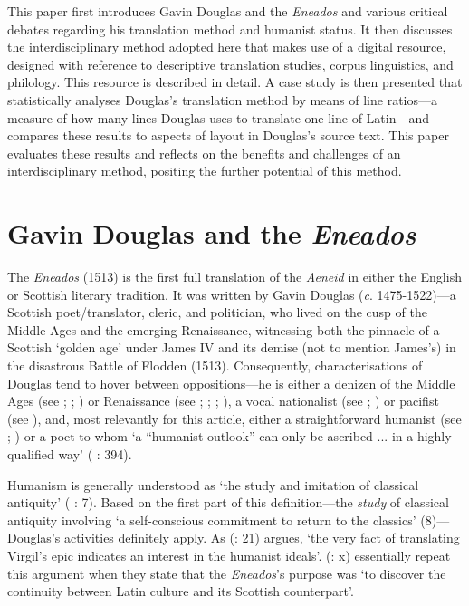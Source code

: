 \documentclass{dhbenelux}
\begin{document}
This paper first introduces Gavin Douglas and the \emph{Eneados} and
various critical debates regarding his translation method and humanist
status. It then discusses the interdisciplinary method adopted here that
makes use of a digital resource, designed with reference to descriptive
translation studies, corpus linguistics, and philology. This resource is
described in detail. A case study is then presented that statistically
analyses Douglas's translation method by means of line ratios---a
measure of how many lines Douglas uses to translate one line of
Latin---and compares these results to aspects of layout in Douglas's
source text. This paper evaluates these results and reflects on the
benefits and challenges of an interdisciplinary method, positing the
further potential of this method. 

\section{Gavin Douglas and the \emph{Eneados}}

The \emph{Eneados} (1513) is the first full translation of the
\emph{Aeneid} in either the English or Scottish literary tradition. It
was written by Gavin Douglas (\emph{c}. 1475-1522)---a Scottish
poet/translator, cleric, and politician, who lived on the cusp of the
Middle Ages and the emerging Renaissance, witnessing both the pinnacle
of a Scottish `golden age' under James IV and its demise (not to mention
James's) in the disastrous Battle of Flodden (1513). Consequently,
characterisations of Douglas tend to hover between oppositions---he is
either a denizen of the Middle Ages (see \citeauthor{lewis1954} 
\citeyear{lewis1954}; \citeauthor{rossi1965} \citeyear{rossi1965}; 
\citeauthor{blyth1987} \citeyear{blyth1987}) or Renaissance (see 
\citeauthor{dearing1952} \citeyear{dearing1952}; 
\citeauthor{brewerhall1960} \citeyear{brewerhall1960}; 
\citeauthor{fox1966} \citeyear{fox1966}; \citeauthor{morgan1977} 
\citeyear{morgan1977}), a vocal nationalist (see \citeauthor{canitz1996} 
\citeyear{canitz1996}; \citeauthor{corbett1999} \citeyear{corbett1999}) 
or pacifist (see \citeauthor{cummings1995} \citeyear{cummings1995}), 
and, most relevantly for this article, either a straightforward humanist 
(see \citeauthor{jack1972} \citeyear{jack1972}; \citeauthor{canitz1996} 
\citeyear{canitz1996}) or a poet to whom `a ``humanist outlook'' can only 
be ascribed ... in a highly qualified way' (\citeauthor{ross1986} 
\citeyear{ross1986}: 394).

Humanism is generally understood as `the study and imitation of
classical antiquity' (\citeauthor{wakelin2007} \citeyear{wakelin2007}: 
7). Based on the first part of this definition---the \emph{study} of 
classical antiquity involving `a self-conscious commitment to return to 
the classics' (8)---Douglas's activities definitely apply. As 
\citeauthor{jack1972} (\citeyear{jack1972}: 21) argues, `the very fact
of translating Virgil's epic indicates an interest in the humanist
ideals'. \citeauthor{johnsonpetrina2018} 
(\citeyear{johnsonpetrina2018}: x) essentially repeat this argument
when they state that the \emph{Eneados}'s purpose was `to discover the
continuity between Latin culture and its Scottish counterpart'.
\end{document}
